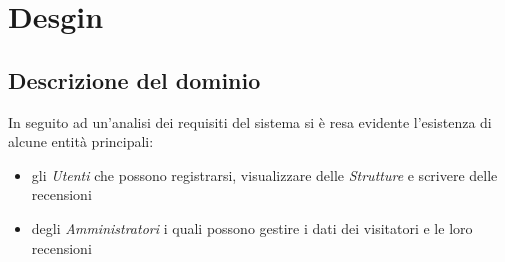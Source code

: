 %
%	 
%

\chapter{Desgin}
\section{Descrizione del dominio}
In seguito ad un'analisi dei requisiti del sistema si è resa evidente l'esistenza di alcune entità
principali:
\begin{itemize}
    \item gli \textit{Utenti} che possono registrarsi, visualizzare delle \textit{Strutture}
    e scrivere delle recensioni
    \item degli \textit{Amministratori} i quali possono gestire i dati dei visitatori e le loro recensioni
\end{itemize}
